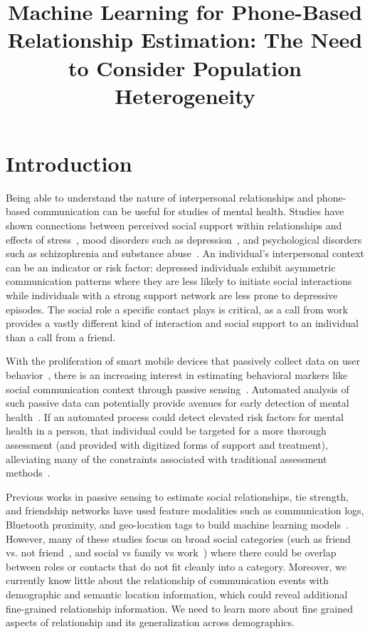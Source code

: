\documentclass[acmlarge]{acmart}
\title{Machine Learning for Phone-Based Relationship Estimation: The Need to Consider Population Heterogeneity}
\date{}
\author{}
\begin{document}
\maketitle

\section{Introduction}
\label{sec:intro}
Being able to understand the nature of interpersonal relationships and phone-based communication can be useful for studies of mental health. Studies have shown connections between perceived social support within relationships and effects of stress~\cite{cutrona1987provisions}, mood disorders such as depression~\cite{george1989social}, and psychological disorders such as schizophrenia and substance abuse~\cite{salyers2001social}. An individual's interpersonal context can be an indicator or risk factor: depressed individuals exhibit asymmetric communication patterns where they are less likely to initiate social interactions~\cite{hames2013interpersonal} while individuals with a strong support network are less prone to depressive episodes. The social role a specific contact plays is critical, as a call from work provides a vastly different kind of interaction and social support to an individual than a call from a friend. 

With the proliferation of smart mobile devices that passively collect data on user behavior~\cite{harari2017smartphone}, there is an increasing interest in estimating behavioral markers like social communication context through passive sensing~\cite{lane2010survey,mohr2017personal}. Automated analysis of such passive data can potentially provide avenues for early detection of mental health~\cite{canzian2015trajectories}. If an automated process could detect elevated risk factors for mental health in a person, that individual could be targeted for a more thorough assessment (and provided with digitized forms of support and treatment), alleviating many of the constraints associated with traditional assessment methods~\cite{suchman1962analysis}.

Previous works in passive sensing to estimate social relationships, tie strength, and friendship networks have used feature modalities such as communication logs, Bluetooth proximity, and geo-location tags to build machine learning models~\cite{eagle2009inferring,min2013mining,wiese2015you,hsieh2014inferring}. However, many of these studies focus on broad social categories (such as friend vs. not friend~\cite{eagle2009inferring}, and social vs family vs work~\cite{min2013mining}) where there could be overlap between roles or contacts that do not fit cleanly into a category. Moreover, we currently know little about the relationship of communication events with demographic and semantic location information, which could reveal additional fine-grained relationship information. We need to learn more about fine grained aspects of relationship and its generalization across demographics.
\end{document}
